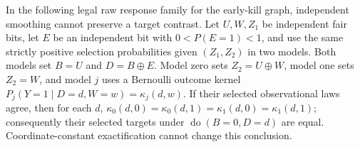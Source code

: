 In the following legal raw response family for the early-kill graph, independent smoothing cannot preserve a target contrast. Let \(U,W,Z_1\) be independent fair bits, let \(E\) be an independent bit with \(0<P(E=1)<1\), and use the same strictly positive selection probabilities given \((Z_1,Z_2)\) in two models. Both models set \(B=U\) and \(D=B\oplus E\). Model zero sets \(Z_2=U\oplus W\), model one sets \(Z_2=W\), and model \(j\) uses a Bernoulli outcome kernel \(P_j(Y=1\mid D=d,W=w)=\kappa_j(d,w)\). If their selected observational laws agree, then for each \(d\), \(\kappa_0(d,0)=\kappa_0(d,1)=\kappa_1(d,0)=\kappa_1(d,1)\); consequently their selected targets under \(\operatorname{do}(B=0,D=d)\) are equal. Coordinate-constant exactification cannot change this conclusion.